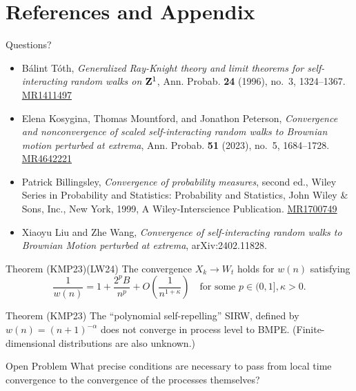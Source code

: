 \documentclass{if-beamer}
\newcommand{\MR}[1]{\href{http://www.ams.org/mathscinet-getitem?mr=#1}{MR#1}}
\begin{document}
\section{References and Appendix}
\begin{frame}
    \begin{center}
        \Huge Questions?
    \end{center}
\vfill
    
\begin{itemize}
\item
    B\'{a}lint T\'{o}th, \emph{Generalized {R}ay-{K}night theory and limit theorems for self-interacting random walks on {${\bf Z}^1$}}, Ann. Probab. \textbf{24} (1996), no.~3, 1324--1367. \MR{1411497}

    \item
    Elena Kosygina, Thomas Mountford, and Jonathon Peterson,  \emph{Convergence and nonconvergence of scaled self-interacting random walks to {B}rownian motion perturbed at extrema}, Ann. Probab. \textbf{51} (2023), no.~5, 1684--1728. \MR{4642221}

    \item
    Patrick Billingsley, \emph{Convergence of probability measures}, second ed., Wiley Series in Probability and Statistics: Probability and Statistics, John Wiley \& Sons, Inc., New York, 1999, A Wiley-Interscience Publication. \MR{1700749}

    \item
    Xiaoyu Liu and Zhe Wang, \emph{Convergence of self-interacting random walks to Brownian Motion perturbed at extrema}, arXiv:2402.11828.

    \end{itemize}
\end{frame}

\begin{frame}
    \begin{block}{Theorem (KMP23)(LW24)}
        The convergence $X_k \to W_t$ holds for $w(n)$ satisfying
        \begin{equation*}
            \frac{1}{w(n)}=1+\frac{2^p B}{n^p}+O\left(\frac{1}{n^{1+\kappa}}\right) \quad \text{for some } p\in (0, 1], \kappa>0
        .\end{equation*}
    \end{block}
    \begin{block}{Theorem (KMP23)}
        The ``polynomial self-repelling'' SIRW, defined by
            $w(n)=(n+1)^{-\alpha}$
        does not converge in process level to BMPE. 
        (Finite-dimensional distributions are also unknown.)
    \end{block}
    \begin{exampleblock}{Open Problem}
        What precise conditions are necessary to pass from local time convergence to the convergence of the processes themselves?
    \end{exampleblock}
\end{frame}
\end{document}
